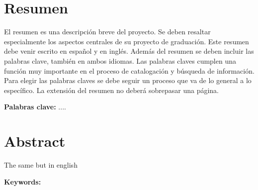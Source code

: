 \chapter*{Resumen}
\thispagestyle{empty}

El resumen es una descripción breve del proyecto. Se deben resaltar 
especialmente los aspectos centrales de su proyecto de graduación. Este 
resumen debe venir escrito en español y en inglés. Además del resumen 
se deben incluir las palabras clave, también en ambos idiomas. Las 
palabras claves cumplen una función muy importante en el proceso de 
catalogación y búsqueda de información. Para elegir las palabras claves 
se debe seguir un proceso que va de lo general a lo específico. La 
extensión del resumen no deberá sobrepasar una página. 


\bigskip

\textbf{Palabras clave:} ....

\clearpage
\chapter*{Abstract}
\thispagestyle{empty}

The same but in english

\bigskip

\textbf{Keywords:} 

\cleardoublepage

